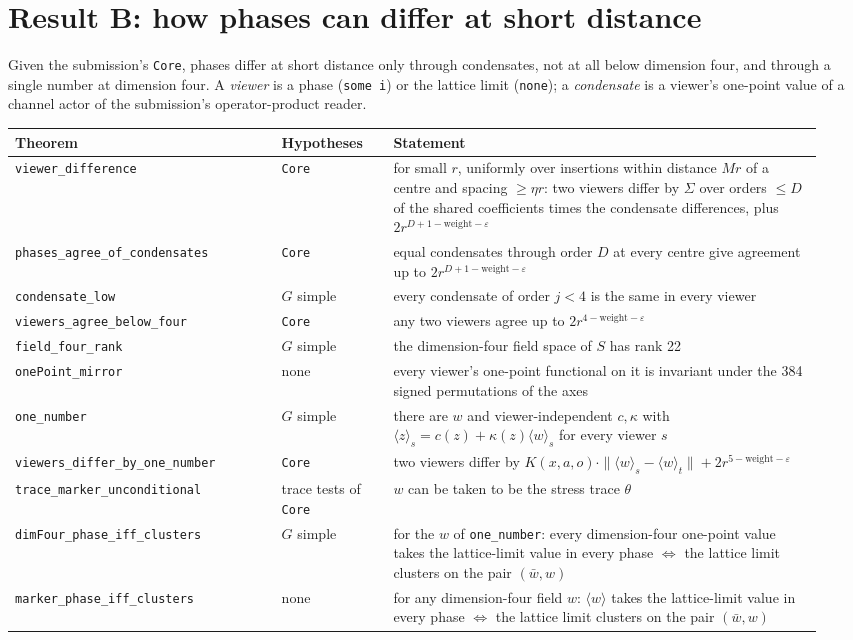 \documentclass[11pt,a4paper]{article}
\newcommand{\ip}[1]{\langle #1\rangle}
\newcommand{\lean}[1]{\texttt{#1}}
\theoremstyle{plain}
\begin{document}
\section{Result B: how phases can differ at short distance}\label{sec:B}

Given the submission's \lean{Core}, phases differ at short distance only through condensates, not at all below dimension four, and through a single number at dimension four. A \emph{viewer} is a phase (\lean{some i}) or the lattice limit (\lean{none}); a \emph{condensate} is a viewer's one-point value of a channel actor of the submission's operator-product reader.

\begin{center}
\footnotesize
\begin{tabular}{@{}>{\raggedright}p{0.31\linewidth}>{\raggedright}p{0.13\linewidth}>{\raggedright\arraybackslash}p{0.5\linewidth}@{}}
\toprule
Theorem & Hypotheses & Statement\\
\midrule
\lean{viewer\_difference} & \lean{Core} & for small $r$, uniformly over insertions within distance $Mr$ of a centre and spacing $\ge\eta r$: two viewers differ by $\Sigma$ over orders $\le D$ of the shared coefficients times the condensate differences, plus $2r^{D+1-\mathrm{weight}-\varepsilon}$\\
\lean{phases\_agree\_of\_condensates} & \lean{Core} & equal condensates through order $D$ at every centre give agreement up to $2r^{D+1-\mathrm{weight}-\varepsilon}$\\
\lean{condensate\_low} & $G$ simple & every condensate of order $j<4$ is the same in every viewer\\
\lean{viewers\_agree\_below\_four} & \lean{Core} & any two viewers agree up to $2r^{4-\mathrm{weight}-\varepsilon}$\\
\lean{field\_four\_rank} & $G$ simple & the dimension-four field space of $S$ has rank 22\\
\lean{onePoint\_mirror} & none & every viewer's one-point functional on it is invariant under the 384 signed permutations of the axes\\
\lean{one\_number} & $G$ simple & there are $w$ and viewer-independent $c,\kappa$ with $\ip{z}_s=c(z)+\kappa(z)\ip{w}_s$ for every viewer $s$\\
\lean{viewers\_differ\_by\_one\_number} & \lean{Core} & two viewers differ by $K(x,a,o)\cdot\|\ip{w}_s-\ip{w}_t\|+2r^{5-\mathrm{weight}-\varepsilon}$\\
\lean{trace\_marker\_unconditional} & trace tests of \lean{Core} & $w$ can be taken to be the stress trace $\theta$\\
\lean{dimFour\_phase\_iff\_clusters} & $G$ simple & for the $w$ of \lean{one\_number}: every dimension-four one-point value takes the lattice-limit value in every phase $\iff$ the lattice limit clusters on the pair $(\bar w,w)$\\
\lean{marker\_phase\_iff\_clusters} & none & for any dimension-four field $w$: $\ip{w}$ takes the lattice-limit value in every phase $\iff$ the lattice limit clusters on the pair $(\bar w,w)$\\
\bottomrule
\end{tabular}
\end{center}
\end{document}
